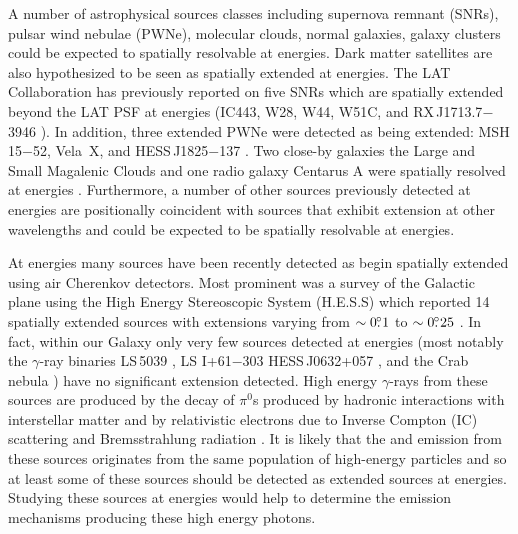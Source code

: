 \documentclass[12pt,preprint]{aastex}
\newcommand{\gev}{\text{GeV}\xspace}
\newcommand{\tev}{\text{TeV}\xspace}
\newcommand{\hl}[1]{#1}
\begin{document}
\hl{

A number of astrophysical sources classes including supernova remnant
(SNRs), pulsar wind nebulae (PWNe), molecular clouds, normal galaxies,
galaxy clusters could be expected to spatially resolvable at \gev
energies.  Dark matter satellites are also hypothesized to be seen
as spatially extended at \gev energies.  The LAT Collaboration has
previously reported on five SNRs which are spatially extended beyond
the LAT PSF at \gev energies (IC443, W28, W44, W51C, and RX\,J1713.7$-$3946
\citep{ic443,w28,w44,w51c,rx_j1713_lat}). In addition, three extended PWNe
were detected as being extended: MSH\,15$-$52, Vela~X, and HESS\,J1825$-$137
\citep{msh1552,velax,fermi_hess_j1825}. Two close-by galaxies the Large
and Small Magalenic Clouds and one radio galaxy Centarus A were spatially
resolved at \gev energies \citep{lmc,smc,cen_a_lat}.  Furthermore,
a number of other sources previously detected at \gev energies are
positionally coincident with sources that exhibit extension at other
wavelengths and could be expected to be spatially resolvable at \gev
energies.

At \tev energies many sources have been recently detected as
begin spatially extended using air Cherenkov detectors.  Most
prominent was a survey of the Galactic plane using the High Energy
Stereoscopic System (H.E.S.S) which reported 14 spatially extended
sources with extensions varying from $\sim0\mbox{$.\!\!^\circ$}1$ to $\sim0\mbox{$.\!\!^\circ$}25$
\citep{hess_plane_survey}.  In fact, within our Galaxy only very few
sources detected at \tev energies (most notably the $\gamma$-ray binaries
LS\,5039 \citep{HESSLS5039}, LS I+61$-$303 \citep{MAGICLSI, VERITASLSI}
HESS\,J0632+057 \citep{HESS0632}, and the Crab nebula \citep{crab_weekes})
have no significant extension detected.  High energy $\gamma$-rays from
these sources are produced by the decay of $\pi^0$s produced by hadronic
interactions with interstellar matter and by relativistic electrons
due to Inverse Compton (IC) scattering and Bremsstrahlung radiation
\citep{blandford_and_eichler_1987}.  It is likely that the \gev and
\tev emission from these sources originates from the same population of
high-energy particles and so at least some of these sources should be
detected as extended sources at \gev energies.  Studying 
these \tev sources at \gev energies would help to
determine the emission mechanisms producing these high energy photons.

}
\end{document}
